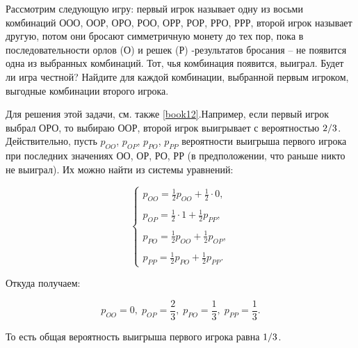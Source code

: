 \begin{problem}
Рассмотрим следующую игру: первый игрок называет одну из восьми комбинаций ООО, ООР, ОРО, РОО, ОРР, РОР, РРО, РРР, второй игрок называет другую, потом они бросают симметричную монету до тех пор, пока в последовательности орлов (О) и решек (Р) -результатов бросания -- не появится одна из выбранных комбинаций. Тот, чья комбинация появится, выиграл. Будет ли игра честной? Найдите для каждой комбинации, выбранной первым игроком, выгодные комбинации второго игрока.
\end{problem}

\begin{ordre} 
Для решения этой задачи, см. также \ref{book12}.Например, если первый игрок выбрал ОРО, то выбираю ООР, второй игрок выигрывает с вероятностью ${2\mathord{\left/ {\vphantom {2 3}} \right. \kern-\nulldelimiterspace} 3} $. Действительно, пусть $p_{OO} $, $p_{OP} $, $p_{PO} $, $p_{PP} $ вероятности выигрыша первого игрока при последних значениях ОО, ОР, РО, РР (в предположении, что раньше никто не выиграл). Их можно найти из системы уравнений:

\[\left\{\begin{array}{l} {p_{OO} =\frac{1}{2} p_{OO} +\frac{1}{2} \cdot 0,} \\ \\ {p_{OP} =\frac{1}{2} \cdot 1+\frac{1}{2} p_{PP} ,} \\ \\ {p_{PO} =\frac{1}{2} p_{OO} +\frac{1}{2} p_{OP} ,} \\ \\ {p_{PP} =\frac{1}{2} p_{PO} +\frac{1}{2} p_{PP} .} \end{array}\right. \] 

Откуда получаем:

\[p_{OO} =0, \; p_{OP} =\frac{2}{3}, \;  p_{PO} =\frac{1}{3}, \; p_{PP} =\frac{1}{3} .\] 

То есть общая вероятность выигрыша первого игрока равна ${1\mathord{\left/ {\vphantom {1 3}} \right. \kern-\nulldelimiterspace} 3}$.
\end{ordre}

